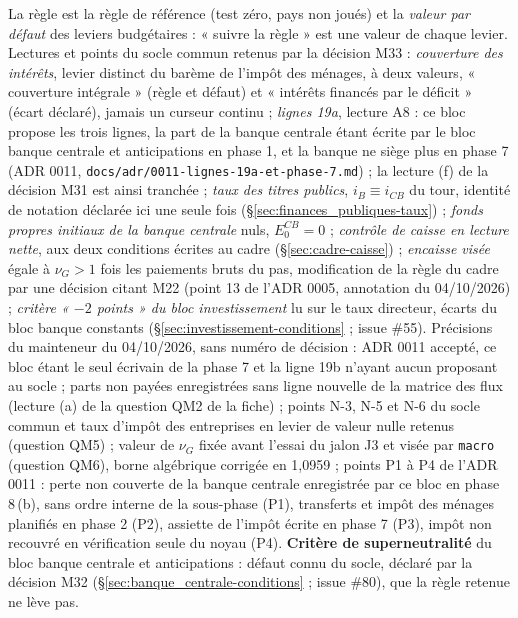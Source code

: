 \documentclass[11pt,a4paper]{article}
\begin{document}
\begin{proposee}
La règle est la règle de référence (test zéro, pays non joués) et la \emph{valeur par défaut} des leviers budgétaires : « suivre la règle » est une valeur de chaque levier. Lectures et points du socle commun retenus par la décision M33 : \emph{couverture des intérêts}, levier distinct du barème de l'impôt des ménages, à deux valeurs, « couverture intégrale » (règle et défaut) et « intérêts financés par le déficit » (écart déclaré), jamais un curseur continu ; \emph{lignes 19a}, lecture A8 : ce bloc propose les trois lignes, la part de la banque centrale étant écrite par le bloc banque centrale et anticipations en phase 1, et la banque ne siège plus en phase 7 (ADR 0011, \nolinkurl{docs/adr/0011-lignes-19a-et-phase-7.md}) ; la lecture (f) de la décision M31 est ainsi tranchée ; \emph{taux des titres publics}, $i_B \equiv i_{\mathit{CB}}$ du tour, identité de notation déclarée ici une seule fois (\S\ref{sec:finances_publiques-taux}) ; \emph{fonds propres initiaux de la banque centrale} nuls, $E^{\mathit{CB}}_0 = 0$ ; \emph{contrôle de caisse en lecture nette}, aux deux conditions écrites au cadre (\S\ref{sec:cadre-caisse}) ; \emph{encaisse visée} égale à $\nu_G > 1$ fois les paiements bruts du pas, modification de la règle du cadre par une décision citant M22 (point 13 de l'ADR 0005, annotation du 04/10/2026) ; \emph{critère « $-2$ points » du bloc investissement} lu sur le taux directeur, écarts du bloc banque constants (\S\ref{sec:investissement-conditions} ; issue \#55). Précisions du mainteneur du 04/10/2026, sans numéro de décision : ADR 0011 accepté, ce bloc étant le seul écrivain de la phase 7 et la ligne 19b n'ayant aucun proposant au socle ; parts non payées enregistrées sans ligne nouvelle de la matrice des flux (lecture (a) de la question QM2 de la fiche) ; points N-3, N-5 et N-6 du socle commun et taux d'impôt des entreprises en levier de valeur nulle retenus (question QM5) ; valeur de $\nu_G$ fixée avant l'essai du jalon J3 et visée par \texttt{macro} (question QM6), borne algébrique corrigée en 1,0959 ; points P1 à P4 de l'ADR 0011 : perte non couverte de la banque centrale enregistrée par ce bloc en phase 8\,(b), sans ordre interne de la sous-phase (P1), transferts et impôt des ménages planifiés en phase 2 (P2), assiette de l'impôt écrite en phase 7 (P3), impôt non recouvré en vérification seule du noyau (P4). \textbf{Critère de superneutralité} du bloc banque centrale et anticipations : défaut connu du socle, déclaré par la décision M32 (\S\ref{sec:banque_centrale-conditions} ; issue \#80), que la règle retenue ne lève pas.


\end{proposee}
\end{document}
